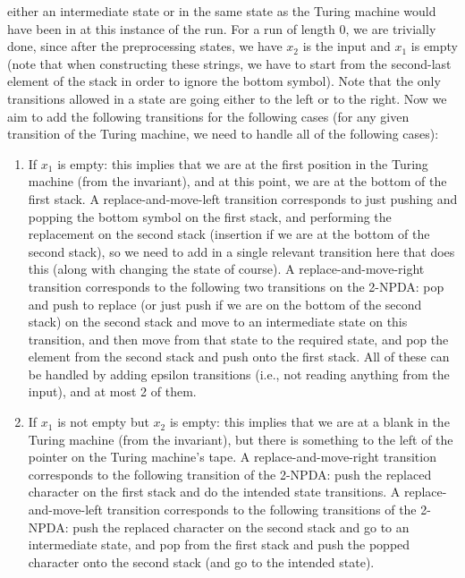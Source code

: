 \begin{soln}
    either an intermediate state or in the same state as the Turing machine would have been in at this instance of the run.\nl
    For a run of length 0, we are trivially done, since after the preprocessing states, we have $x_2$ is the input and $x_1$ is empty (note that when constructing these strings, we have to start
    from the second-last element of the stack in order to ignore the bottom symbol).\nl
    Note that the only transitions allowed in a state are going either to the left or to the right.\nl
    Now we aim to add the following transitions for the following cases (for any given transition of the Turing machine, we need to handle all of the following cases):
    \begin{enumerate}
        \item If $x_1$ is empty: this implies that we are at the first position in the Turing machine (from the invariant), and at this point, we are at the bottom of the first stack. A
            replace-and-move-left transition corresponds to just pushing and popping the bottom symbol on the first stack, and performing the replacement on the second stack (insertion if we are at
            the bottom of the second stack), so we need to add in
            a single relevant transition here that does this (along with changing the state of course). A replace-and-move-right transition corresponds to the following two transitions on the
            2-NPDA: pop and push to replace (or just push if we are on the bottom of the second stack) on the second stack and move to an intermediate state on this transition, and then move from that state to the required state, and pop the element from the
            second stack and push onto the first stack. All of these can be handled by adding epsilon transitions (i.e., not reading anything from the input), and at most 2 of them.
        \item If $x_1$ is not empty but $x_2$ is empty: this implies that we are at a blank in the Turing machine (from the invariant), but there is something to the left of the pointer on the
            Turing machine's tape. A replace-and-move-right transition corresponds to the following transition of the 2-NPDA: push the replaced character on the first stack and do the intended
            state transitions. A replace-and-move-left transition corresponds to the following transitions of the 2-NPDA: push the replaced character on the second stack and go to an intermediate
            state, and pop from the first stack and push the popped character onto the second stack (and go to the intended state).

\end{enumerate}
\end{soln}
